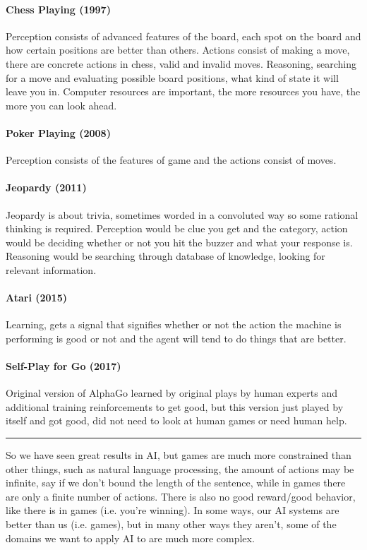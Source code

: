 \documentclass[12 pt]{article}
\begin{document}
            \paragraph{Chess Playing (1997)} Perception consists of
            advanced features of the board, each spot on the board and
            how certain positions are better than others. Actions
            consist of making a move, there are concrete actions in
            chess, valid and invalid moves. Reasoning, searching for a
            move and evaluating possible board positions, what kind of
            state it will leave you in. Computer resources are
            important, the more resources you have, the more you can
            look ahead.
            \paragraph{Poker Playing (2008)} Perception consists of
            the features of game and the actions consist of moves. 
            \paragraph{Jeopardy (2011)} Jeopardy is about
            trivia, sometimes worded in a convoluted way so some
            rational thinking is required. Perception would be clue
            you get and the category,
            action would be deciding whether or not you hit the buzzer
            and what your response is. Reasoning would be searching
            through database of knowledge, looking for relevant information.
            \paragraph{Atari (2015)} Learning, gets a signal that
            signifies whether or not the action the machine is
            performing is good or not and the agent will tend to do
            things that are better.
            \paragraph{Self-Play for Go (2017)} Original version of
            AlphaGo learned by original plays by human experts and
            additional training reinforcements to get good, but this
            version just played by itself and got good, did not need
            to look at human games or need human help.
            \noindent\rule{\textwidth}{0.5pt}
            So we have seen great results in AI, but games are much
            more constrained than other things, such as natural
            language processing, the amount of actions may be
            infinite, say if we don't bound the length of the
            sentence, while in games there are only a finite number of
            actions. There is also no good reward/good behavior, like
            there is in games (i.e. you're winning). In some ways, our
            AI systems are better than us (i.e. games), but in many
            other ways they aren't, some of the domains we want to
            apply AI to are much more complex.
\end{document}
